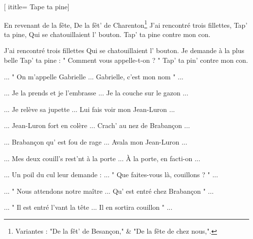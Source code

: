  [
ititle= {Tape ta pine}]

\beginverse
En revenant de la fête,
De la fêt' de Charenton\footnote {Variantes : "De la fêt' de Besançon," & "De la fête de chez nous,".}
J'ai rencontré trois fillettes,
Tap' ta pine,
Qui se chatouillaient l' bouton.
Tap' ta pine contre mon con.
\endverse

\beginverse
J'ai rencontré trois fillettes
Qui se chatouillaient l' bouton.
Je demande à la plus belle
Tap' ta pine :
" Comment vous appelle-t-on ? "
Tap' ta pin' contre mon con.
\endverse

\beginverse
... " On m'appelle Gabrielle ...
Gabrielle, c'est mon nom " ...
\endverse

\beginverse
... Je la prends et je l'embrasse ...
Je la couche sur le gazon ...
\endverse

\beginverse
... Je relève sa jupette ...
Lui fais voir mon Jean-Luron ...
\endverse

\beginverse
... Jean-Luron fort en colère ...
Crach' au nez de Brabançon ...
\endverse

\beginverse
... Brabançon qu' est fou de rage ...
Avala mon Jean-Luron ...
\endverse

\beginverse
... Mes deux couill's rest'nt à la porte ...
À la porte, en facti-on ...
\endverse

\beginverse
... Un poil du cul leur demande : ...
" Que faites-vous là, couillons ? " ...
\endverse

\beginverse
... " Nous attendons notre maître ...
Qu' est entré chez Brabançon " ...
\endverse

\beginverse
... " Il est entré l'vant la tête ...
Il en sortira couillon " ...
\endverse

\endsong
